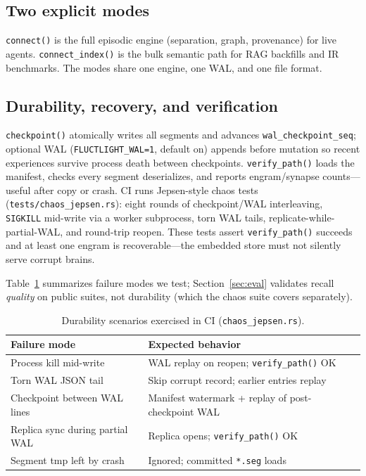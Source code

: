 \documentclass[11pt]{article}
\begin{document}
\subsection{Two explicit modes}
\texttt{connect()} is the full episodic engine (separation, graph, provenance) for
live agents. \texttt{connect\_index()} is the bulk semantic path for RAG backfills
and IR benchmarks. The modes share one engine, one WAL, and one file format.

\subsection{Durability, recovery, and verification}
\texttt{checkpoint()} atomically writes all segments and advances
\texttt{wal\_checkpoint\_seq}; optional WAL (\texttt{FLUCTLIGHT\_WAL=1}, default on)
appends before mutation so recent experiences survive process death between checkpoints.
\texttt{verify\_path()} loads the manifest, checks every segment deserializes, and
reports engram/synapse counts---useful after copy or crash. CI runs Jepsen-style chaos
tests (\texttt{tests/chaos\_jepsen.rs}): eight rounds of checkpoint/WAL interleaving,
\texttt{SIGKILL} mid-write via a worker subprocess, torn WAL tails, replicate-while-partial-WAL,
and round-trip reopen. These tests assert \texttt{verify\_path()} succeeds and at least
one engram is recoverable---the embedded store must not silently serve corrupt brains.

Table~\ref{tab:durability} summarizes failure modes we test; Section~\ref{sec:eval}
validates recall \emph{quality} on public suites, not durability (which the chaos suite
covers separately).

\begin{table}[h]
\centering
\caption{Durability scenarios exercised in CI (\texttt{chaos\_jepsen.rs}).}
\label{tab:durability}
\small
\begin{tabular}{p{3.2cm}p{4.8cm}}
\toprule
\textbf{Failure mode} & \textbf{Expected behavior} \\
\midrule
Process kill mid-write & WAL replay on reopen; \texttt{verify\_path()} OK \\
Torn WAL JSON tail & Skip corrupt record; earlier entries replay \\
Checkpoint between WAL lines & Manifest watermark + replay of post-checkpoint WAL \\
Replica sync during partial WAL & Replica opens; \texttt{verify\_path()} OK \\
Segment tmp left by crash & Ignored; committed \texttt{*.seg} loads \\
\bottomrule
\end{tabular}
\end{table}
\end{document}
